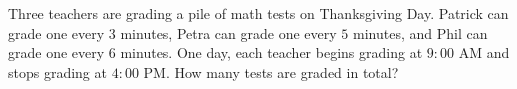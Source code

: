 Three teachers are grading a pile of math tests on Thanksgiving Day. Patrick can grade one every $3$ minutes, Petra can grade one every $5$ minutes, and Phil can grade one every $6$ minutes. One day, each teacher begins grading at $9:00$ AM and stops grading at $4:00$ PM. How many tests are graded in total?
